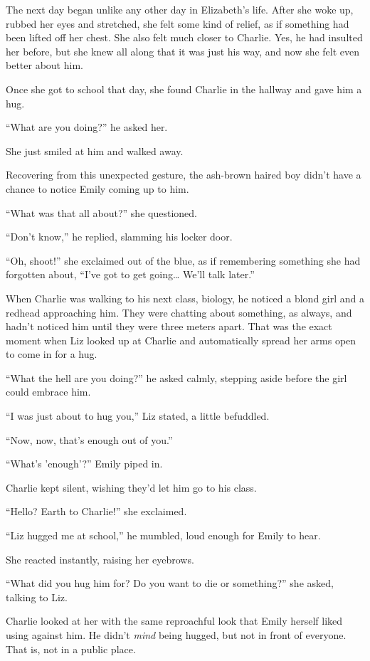 The next day began unlike any other day in Elizabeth's life. After she woke up, rubbed her eyes and stretched, she felt some kind of relief, as if something had been lifted off her chest. She also felt much closer to Charlie. Yes, he had insulted her before, but she knew all along that it was just his way, and now she felt even better about him.

Once she got to school that day, she found Charlie in the hallway and gave him a hug.

“What are you doing?” he asked her.

She just smiled at him and walked away.

Recovering from this unexpected gesture, the ash-brown haired boy didn't have a chance to notice Emily coming up to him.

“What was that all about?” she questioned.

“Don't know,” he replied, slamming his locker door.

“Oh, shoot!” she exclaimed out of the blue, as if remembering something she had forgotten about, “I've got to get going… We'll talk later.”

\bigskip

When Charlie was walking to his next class, biology, he noticed a blond girl and a redhead approaching him. They were chatting about something, as always, and hadn't noticed him until they were three meters apart. That was the exact moment when Liz looked up at Charlie and automatically spread her arms open to come in for a hug.

“What the hell are you doing?” he asked calmly, stepping aside before the girl could embrace him.

“I was just about to hug you,” Liz stated, a little befuddled.

“Now, now, that's enough out of you.”

“What's 'enough'?” Emily piped in.

Charlie kept silent, wishing they'd let him go to his class.

“Hello? Earth to Charlie!” she exclaimed.

“Liz hugged me at school,” he mumbled, loud enough for Emily to hear.

She reacted instantly, raising her eyebrows.

“What did you hug him for? Do you want to die or something?” she asked, talking to Liz.

Charlie looked at her with the same reproachful look that Emily herself liked using against him. He didn't \textit{mind} being hugged, but not in front of everyone. That is, not in a public place.


